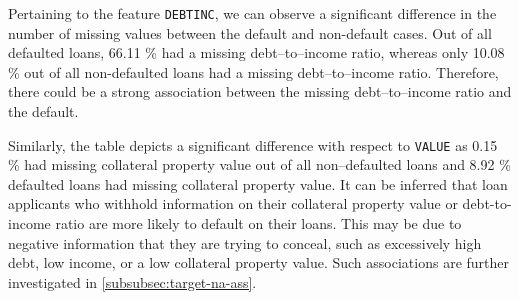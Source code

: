 Pertaining to the feature \texttt{DEBTINC}, we can observe a significant difference in the number of missing values between the default and non-default cases. Out of all defaulted loans, 66.11 \% had a missing debt--to--income ratio, whereas only 10.08 \% out of all non-defaulted loans had a missing debt--to--income ratio.
Therefore, there could be a strong association between the missing debt--to--income ratio and the default.


Similarly, the table depicts a significant difference with respect to \texttt{VALUE} as 0.15 \% had missing collateral property value out of all non--defaulted loans and 8.92 \% defaulted loans had missing collateral property value.
It can be inferred that loan applicants who withhold information on their collateral property value or debt-to-income ratio are more likely to default on their loans.
This may be due to negative information that they are trying to conceal, such as excessively high debt, low income, or a low collateral property value.
Such associations are further investigated in \autoref{subsubsec:target-na-ass}.


